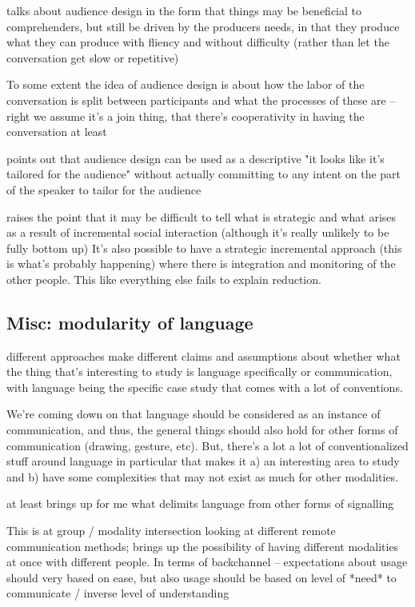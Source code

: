 \documentclass[]{article}
\begin{document}
\cite{macdonald2013} talks about audience design in the form that things may be beneficial to comprehenders, but still be driven by the producers needs, in that they produce what they can produce with fliency and without difficulty (rather than let the conversation get slow or repetitive) 

To some extent the idea of audience design is about how the labor of the conversation is split between participants and what the processes of these are -- right we assume it's a join thing, that there's cooperativity in having the conversation at least 

\cite{rogers2013} points out that audience design can be used as a descriptive "it looks like it's tailored for the audience" without actually committing to any intent on the part of the speaker to tailor for the audience 

\cite{rogers2013} raises the point that it may be difficult to tell what is strategic and what arises as a result of incremental social interaction (although it's really unlikely to be fully bottom up) It's also possible to have a strategic incremental approach (this is what's probably happening) where there is integration and monitoring of the other people. This like everything else fails to explain reduction. 

\subsection{Misc: modularity of language}
different approaches make different claims and assumptions about whether what the thing that's interesting to study is language specifically or communication, with language being the specific case study that comes with a lot of conventions. 

We're coming down on that language should be considered as an instance of communication, and thus, the general things should also hold for other forms of communication (drawing, gesture, etc). But, there's a lot a lot of conventionalized stuff around language in particular that makes it a) an interesting area to study and b) have some complexities that may not exist as much for other modalities. 

\cite{clark1996} at least brings up for me what delimits language from other forms of signalling

This is at group / modality intersection \cite{foxtree2013} looking at different remote communication methods; brings up the possibility of having different modalities at once with different people. In terms of backchannel -- expectations about usage should very based on ease, but also usage should be based on level of *need* to communicate / inverse level of understanding 
\end{document}
